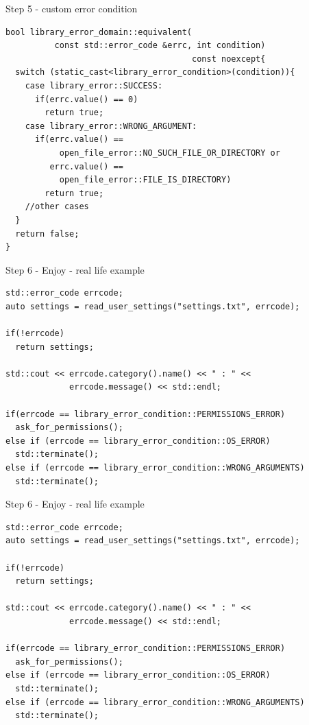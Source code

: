 \documentclass[10pt]{beamer}
\begin{document}
\begin{frame}[fragile]{Step 5 - custom error condition}
	\begin{verbatim}
bool library_error_domain::equivalent(
          const std::error_code &errc, int condition) 
                                      const noexcept{                     
  switch (static_cast<library_error_condition>(condition)){
    case library_error::SUCCESS:
      if(errc.value() == 0)
        return true;
    case library_error::WRONG_ARGUMENT:
      if(errc.value() == 
           open_file_error::NO_SUCH_FILE_OR_DIRECTORY or
         errc.value() == 
           open_file_error::FILE_IS_DIRECTORY)
        return true;
    //other cases    
  }
  return false;
}
	\end{verbatim}
\end{frame}

\begin{frame}[fragile]{Step 6 - Enjoy - real life example}
	\begin{verbatim}
std::error_code errcode;
auto settings = read_user_settings("settings.txt", errcode);

if(!errcode)
  return settings;

std::cout << errcode.category().name() << " : " <<
             errcode.message() << std::endl;

if(errcode == library_error_condition::PERMISSIONS_ERROR)
  ask_for_permissions();
else if (errcode == library_error_condition::OS_ERROR)
  std::terminate();
else if (errcode == library_error_condition::WRONG_ARGUMENTS)
  std::terminate();
	\end{verbatim}
\end{frame}

\begin{frame}[fragile]{Step 6 - Enjoy - real life example}
	\begin{verbatim}
std::error_code errcode;
auto settings = read_user_settings("settings.txt", errcode);

if(!errcode)
  return settings;

std::cout << errcode.category().name() << " : " <<
             errcode.message() << std::endl;

if(errcode == library_error_condition::PERMISSIONS_ERROR)
  ask_for_permissions();
else if (errcode == library_error_condition::OS_ERROR)
  std::terminate();
else if (errcode == library_error_condition::WRONG_ARGUMENTS)
  std::terminate();
	\end{verbatim}
\end{frame}
\end{document}
